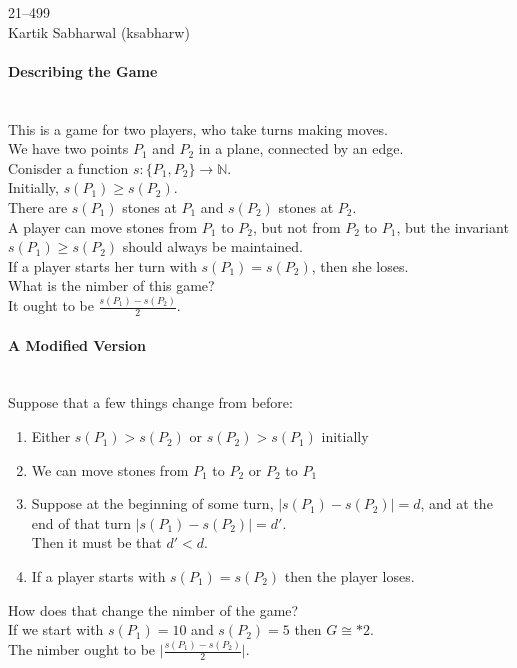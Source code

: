 \documentclass{article}
\newcommand{\N}{\mathbb{N}}
\newcommand{\len}[1]{\vert#1\vert}
\begin{document}
\begin{center}
  21--499 \\
  Kartik Sabharwal (ksabharw)
\end{center}
\paragraph{Describing the Game}\mbox{}\\
This is a game for two players, who take turns making moves. \\
We have two points $P_1$ and $P_2$ in a plane, connected by an edge. \\
Conisder a function $s : \{P_1, P_2\} \rightarrow \N$. \\
Initially, $s(P_1) \geq s(P_2)$. \\
There are $s(P_1)$ stones at $P_1$ and $s(P_2)$ stones at $P_2$. \\
A player can move stones from $P_1$ to $P_2$, but not from $P_2$ to $P_1$,
but the invariant $s(P_1) \geq s(P_2)$ should always be maintained. \\
If a player starts her turn with $s(P_1) = s(P_2)$, then she loses. \\
What is the nimber of this game? \\
It ought to be $\frac{s(P_1) - s(P_2)}{2}$.

\paragraph{A Modified Version}\mbox{}\\
Suppose that a few things change from before:
\begin{enumerate}
  \item Either $s(P_1) > s(P_2)$ or $s(P_2) > s(P_1)$ initially
  \item We can move stones from $P_1$ to $P_2$ or $P_2$ to $P_1$
  \item Suppose at the beginning of some turn, $\len{s(P_1)-s(P_2)} = d$, and
    at the end of that turn $\len{s(P_1) - s(P_2)} = d'$. \\
    Then it must be that $d' < d$.
  \item If a player starts with $s(P_1) = s(P_2)$ then the player loses.
\end{enumerate}
How does that change the nimber of the game? \\
If we start with $s(P_1) = 10$ and $s(P_2) = 5$ then $G \cong *2$. \\
The nimber ought to be $\len{\frac{s(P_1) - s(P_2)}{2}}$.
\end{document}
